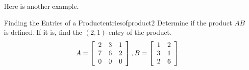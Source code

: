 Here is another example.

\begin{example}{Finding the Entries of a Product}{entriesofproduct2}
Determine if the product $AB$ is defined. If it is, find the $\left( 2, 1 \right)$-entry of the product.
\begin{equation*}
A=
\left[
\begin{array}{rrr}
2 & 3 & 1 \\
7 & 6 & 2 \\
0 & 0 & 0
\end{array}
\right],  B =\left[
\begin{array}{rr}
1 & 2 \\
3 & 1 \\
2 & 6
\end{array}
\right] 
\end{equation*}
\end{example}

